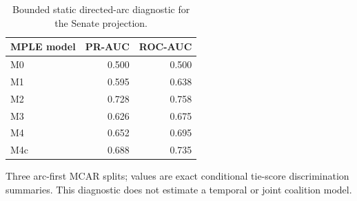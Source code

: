 \begin{table}[tbp]
\centering
\caption{Bounded static directed-arc diagnostic for the Senate projection.}
\label{tab:static-diagnostic}
\begin{tabular}{lrr}
\toprule
MPLE model & PR-AUC & ROC-AUC \\
\midrule
M0 & 0.500 & 0.500 \\
M1 & 0.595 & 0.638 \\
M2 & 0.728 & 0.758 \\
M3 & 0.626 & 0.675 \\
M4 & 0.652 & 0.695 \\
M4c & 0.688 & 0.735 \\
\bottomrule
\end{tabular}
\par\vspace{2pt}\footnotesize Three arc-first MCAR splits; values are exact conditional tie-score discrimination summaries. This diagnostic does not estimate a temporal or joint coalition model.
\end{table}
